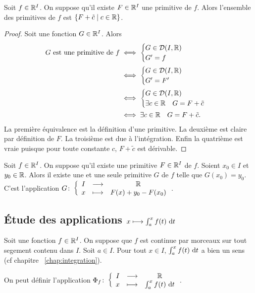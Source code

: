 \begin{theo}
  Soit \(f \in \mathbb{R}^I\). On suppose qu'il existe \(F \in \mathbb{R}^I\) une primitive de \(f\). Alors l'ensemble des primitives de \(f\) est \(\left\{F+\tilde{c}\mathrel{}\middle|\mathrel{}c \in \mathbb{R}\right\}\).
\end{theo}
\begin{proof}
  Soit une fonction \(G \in \mathbb{R}^I\). Alors
  \begin{align}
    G \text{~est une primitive de~} f &\iff \begin{cases} G \in \mathcal{D}(I,\mathbb{R}) \\ G'=f \end{cases} \\
    &\iff \begin{cases} G \in \mathcal{D}(I,\mathbb{R}) \\ G'=F' \end{cases} \\ 
    &\iff \begin{cases} G \in \mathcal{D}(I,\mathbb{R}) \\ \exists c \in \mathbb{R} \quad G=F+\tilde{c} \end{cases} \\
    &\iff \exists c \in \mathbb{R} \quad G=F+\tilde{c}.
   \end{align}
   La première équivalence est la définition d'une primitive. La deuxième est claire par définition de \(F\). La troisième est due à l'intégration. Enfin la quatrième est vraie puisque pour toute constante \(c\), \(F+\tilde{c}\) est dérivable.
\end{proof}

\begin{corth}
  Soit \(f \in \mathbb{R}^I\). On suppose qu'il existe une primitive \(F \in \mathbb{R}^I\) de \(f\). Soient \(x_0 \in I\) et \(y_0 \in \mathbb{R}\). Alors il existe une et une seule primitive \(G\) de \(f\) telle que \(G(x_0)=y_0\). C'est l'application \(G\colon \left\{\begin{array}{ccc} I & \longrightarrow &\mathbb{R}\\ x & \longmapsto & F(x)+y_0-F(x_0) \end{array} \right.\).
\end{corth}

\subsection{Étude des applications \(x \longmapsto \int_a^x f(t)\,\mathop{}\mathopen{}\mathrm{d} t\)}

Soit une fonction \(f \in \mathbb{R}^I\). On suppose que \(f\) est continue par morceaux sur tout segement contenu dans \(I\). Soit \(a \in I\). Pour tout \(x \in I\), \(\int_a^xf(t)\,\mathop{}\mathopen{}\mathrm{d} t\) a bien un sens (cf chapitre~
\ref{chap:integration}).

On peut définir l'application \(\Phi_f\colon \left\{\begin{array}{ccc} I & \longrightarrow &\mathbb{R}\\ x & \longmapsto & \int_a^x f(t)\,\mathop{}\mathopen{}\mathrm{d} t \end{array} \right.\).

